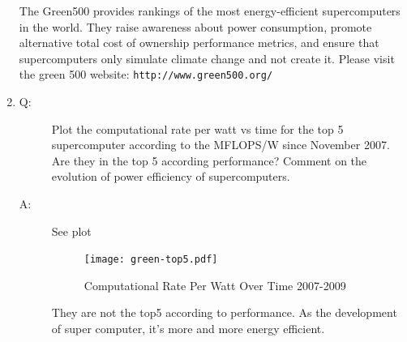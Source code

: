 \documentclass[12pt]{article}
\begin{document}
\begin{enumerate}
The Green500 provides rankings of the most energy-efficient supercomputers in the 
world. They raise awareness about power consumption, promote alternative total 
cost of ownership performance metrics, and ensure that supercomputers only simulate 
climate change and not create it. Please visit the green 500 website: 
\texttt{http://www.green500.org/}

\item
\begin{description}
\item[Q: ]Plot the computational rate per watt vs time for the top 5 supercomputer 
according to the MFLOPS/W since November 2007. Are they in the top 5 according 
performance? Comment on the evolution of power efficiency of supercomputers.
\item[A: ] See plot
\begin{figure}[h!]
	\begin{center}
		\texttt{[image: green-top5.pdf]}
		\caption{\label{fig:green-top5}Computational Rate Per Watt Over Time 2007-2009}
	\end{center}
\end{figure}
They are not the top5 according to performance. As the development of super computer,
it's more and more energy efficient.

\end{description}


\end{enumerate}
\end{document}
